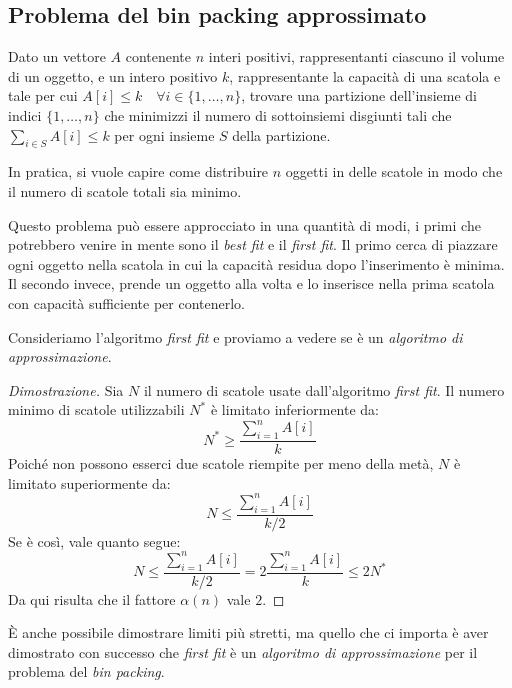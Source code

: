 \subsection{Problema del bin packing approssimato}
\begin{problem}
    Dato un vettore $A$ contenente $n$ interi positivi, rappresentanti ciascuno il
    volume di un oggetto, e un intero positivo $k$, rappresentante la capacità di
    una scatola e tale per cui $A[i]\leq k\quad\forall i\in\{1,\dots,n\}$,
    trovare una partizione dell'insieme di indici $\{1,\dots,n\}$ che minimizzi
    il numero di sottoinsiemi disgiunti tali che $\sum_{i\in S}A[i]\leq k$
    per ogni insieme $S$ della partizione.
\end{problem}
\begin{note}
    In pratica, si vuole capire come distribuire $n$ oggetti in delle scatole
    in modo che il numero di scatole totali sia minimo.
\end{note}

\noindent
Questo problema può essere approcciato in una quantità di modi, i primi che
potrebbero venire in mente sono il \emph{best fit} e il \emph{first fit}.
Il primo cerca di piazzare ogni oggetto nella scatola in cui la capacità residua
dopo l'inserimento è minima. Il secondo invece, prende un oggetto alla volta e
lo inserisce nella prima scatola con capacità sufficiente per contenerlo.

\bigskip\noindent
Consideriamo l'algoritmo \emph{first fit} e proviamo a vedere se è un
\emph{algoritmo di approssimazione}.

\begin{proof}[Dimostrazione]
    Sia $N$ il numero di scatole usate dall'algoritmo \emph{first fit}. Il numero
    minimo di scatole utilizzabili $N^*$ è limitato inferiormente da:
    \[N^*\geq\frac{\sum_{i=1}^nA[i]}{k}\]
    Poiché non possono esserci due scatole riempite per meno della metà\footnotemark,
    $N$ è limitato superiormente da:
    \[N\leq\frac{\sum_{i=1}^nA[i]}{k/2}\]
    Se è così, vale quanto segue:
    \[N\leq\frac{\sum_{i=1}^nA[i]}{k/2}=2\frac{\sum_{i=1}^nA[i]}{k}\leq 2N^*\]
    Da qui risulta che il fattore $\alpha(n)$ vale $2$.
\end{proof}
\begin{note}
    È anche possibile dimostrare limiti più stretti, ma quello che ci importa è
    aver dimostrato con successo che \emph{first fit} è un \emph{algoritmo di
    approssimazione} per il problema del \emph{bin packing}.
\end{note}


